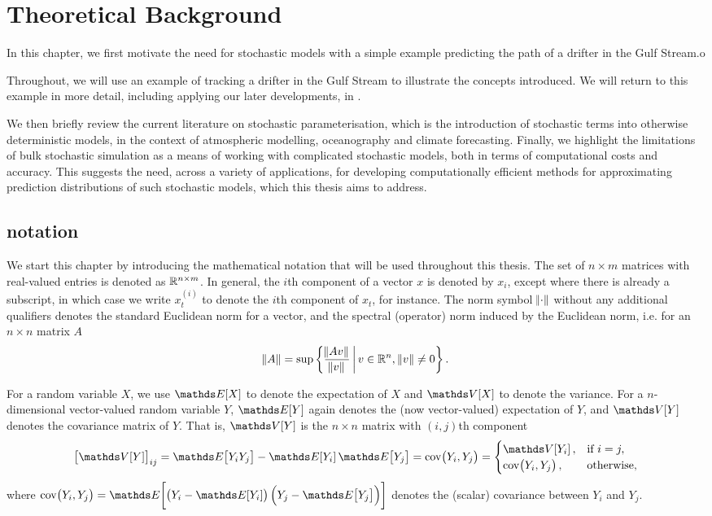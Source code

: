 
\chapter{Theoretical Background}
In this chapter, we first motivate the need for stochastic models with a simple example predicting the path of a drifter in the Gulf Stream.o

Throughout, we will use an example of tracking a drifter in the Gulf Stream to illustrate the concepts introduced.
We will return to this example in more detail, including applying our later developments, in .

We then briefly review the current literature on stochastic parameterisation, which is the introduction of stochastic terms into otherwise deterministic models, in the context of atmospheric modelling, oceanography and climate forecasting.
Finally, we highlight the limitations of bulk stochastic simulation as a means of working with complicated stochastic models, both in terms of computational costs and accuracy.
This suggests the need, across a variety of applications, for developing computationally efficient methods for approximating prediction distributions of such stochastic models, which this thesis aims to address.


\section{notation}
We start this chapter by introducing the mathematical notation that will be used throughout this thesis.
The set of \(n \times m\) matrices with real-valued entries is denoted as \(\mathbb{R}^{n\times m}\).
In general, the \(i\)th component of a vector \(x\) is denoted by \(x_{i}\), except where there is already a subscript, in which case we write \(x_t^{(i)}\) to denote the \(i\)th component of \(x_t\), for instance.
The norm symbol \(\norm{\cdot}\) without any additional qualifiers denotes the standard Euclidean norm for a vector, and the spectral (operator) norm induced by the Euclidean norm, i.e. for an \(n \times n\) matrix \(A\)
\[
	\norm{A} = \sup\left\{\frac{\norm{Av}}{\norm{v}}\,\middle|\,v \in \mathbb{R}^n, \, \norm{v} \neq 0\right\}.
\]

For a random variable \(X\), we use \(\avg{X}\) to denote the expectation of \(X\) and \(\var{X}\) to denote the variance.
For a \(n\)-dimensional vector-valued random variable \(Y\), \(\avg{Y}\) again denotes the (now vector-valued) expectation of \(Y\), and \(\var{Y}\) denotes the covariance matrix of \(Y\).
That is, \(\var{Y}\) is the \(n\times n\) matrix with \((i,j)\)th component
\[
	\left[\var{Y}\right]_{ij} = \avg{Y_iY_j} - \avg{Y_i}\avg{Y_j} = \cov{Y_i, Y_j} = \begin{cases}
		\var{Y_i},      & \text{if } i = j, \\
		\cov{Y_i, Y_j}, & \text{otherwise},
	\end{cases}
\]
where \(\cov{Y_i, Y_j} = \avg{\left(Y_i - \avg{Y_i}\right)\left(Y_j - \avg{Y_j}\right)}\) denotes the (scalar) covariance between \(Y_i\) and \(Y_j\).

